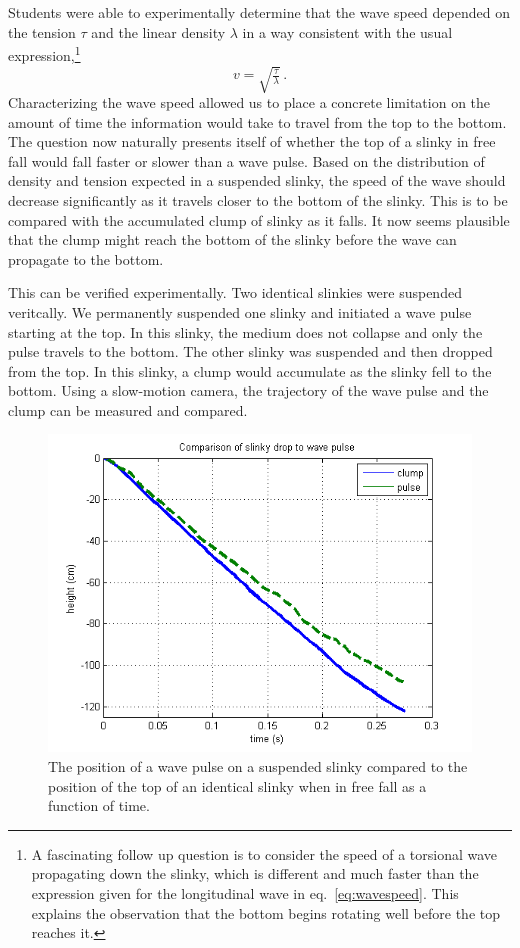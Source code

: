 \documentclass[prb,preprint,superscriptaddress]{revtex4-1}
\newcommand{\eq}[1]{eq.~\eqref{eq:#1}}
\begin{document}
Students were able to experimentally determine that the wave speed depended on the 
tension $\tau$ and the linear density $\lambda$ in a way consistent with the
usual expression,\footnote{A fascinating follow up question is to consider the speed
of a torsional wave propagating down the slinky, which is different and much faster
than the expression given for the longitudinal wave in \eq{wavespeed}.
This explains the observation that the bottom begins
rotating well before the top reaches it.}
\begin{equation}
  \label{eq:wavespeed}
  v=\sqrt{\tfrac{\tau}{\lambda}}\,.
\end{equation}
Characterizing the wave speed allowed us to place a concrete limitation on the amount
of time the information would take to travel from the top to the bottom. The question
now naturally presents itself of whether the top of a slinky in free fall would fall
faster or slower than a wave pulse. Based on the distribution 
of density and tension expected in a suspended slinky, the speed of the wave should decrease significantly as
it travels closer to the bottom of the slinky. This is to be compared with the
accumulated clump of slinky as it falls. It now seems plausible
that the clump might reach the bottom of the slinky before the wave can propagate to the bottom.

This can be verified experimentally. Two identical slinkies were suspended veritcally.
We permanently suspended one slinky and initiated a wave pulse starting at the top.
In this slinky, the medium does not collapse and only the pulse travels to the bottom. The other slinky was suspended and then dropped from the top. In this
slinky, a clump would accumulate as the slinky fell to the bottom. Using a slow-motion camera, the trajectory of the wave pulse
and the clump can be measured and compared.

\begin{figure}[t!]
\begin{center}
\includegraphics[scale=0.5]{figs/ClumpPulse}
\end{center}
\vspace{-4ex}
\caption{The position of a wave pulse on a suspended slinky compared to the position
of the top of an identical slinky when in free fall as a function of time.}
\label{fig:clumppulse}
\end{figure}
\end{document}
